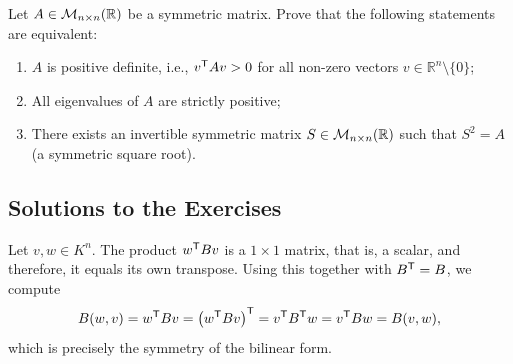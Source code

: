 \begin{exercise}
  \label{exc:positive_definite_equivalent_characterizations}
  Let $A \in \mathcal{M}_{n \times n}(\mathbb{R})$ be a symmetric matrix. Prove that the following statements are equivalent:
  \begin{enumerate}[label=\textbf{(\Alph*)}]
    \item $A$ is positive definite, i.e., $v^{\mathsf{T}} A v > 0$ for all non-zero vectors $v \in \mathbb{R}^n \setminus \{0\}$;
    \item All eigenvalues of $A$ are strictly positive;
    \item There exists an invertible symmetric matrix $S \in \mathcal{M}_{n \times n}(\mathbb{R})$ such that $S^2 = A$ (a symmetric square root).
  \end{enumerate}
\end{exercise}

\subsection{Solutions to the Exercises}
\label{sec:solutions_bilinear_quadratic}

\begin{exercisesolution}
\label{sol:symmetric_matrix_symmetric_form}
Let $v, w \in K^n$. The product $w^{\mathsf{T}} B v$ is a $1 \times 1$ matrix, that is, a scalar, and therefore, it equals its own transpose. Using this together with $B^{\mathsf{T}} = B$, we compute
\[
    B(w, v) = w^{\mathsf{T}} B v = \left(w^{\mathsf{T}} B v\right)^{\mathsf{T}} = v^{\mathsf{T}} B^{\mathsf{T}} w = v^{\mathsf{T}} B w = B(v, w),
\]
which is precisely the symmetry of the bilinear form.
\end{exercisesolution}

